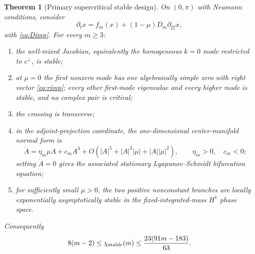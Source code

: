 \documentclass[11pt]{article}
\newtheorem{theorem}{Theorem}[section]
\theoremstyle{definition}
\newcommand{\1}{\mathbf 1}
\begin{document}
\begin{theorem}[Primary supercritical stable design]\label{thm:unitstable}
On $(0,\pi)$ with Neumann conditions, consider
\begin{equation}\label{eq:pdeunit}
 \partial_t x=f_m(x)+(1-\mu)D_m\partial_{\xi\xi}x,
\end{equation}
with \eqref{eq:Dimp}.  For every $m\ge3$:
\begin{enumerate}[leftmargin=2em]
\item the well-mixed Jacobian, equivalently the homogeneous $k=0$ mode
restricted to $c^\perp$, is stable;
\item at $\mu=0$ the first nonzero mode has one algebraically simple zero with
right vector \eqref{eq:rimp}; every other first-mode eigenvalue and every
higher mode is stable, and no complex pair is critical;
\item the crossing is transverse;
\item in the adjoint-projection coordinate, the one-dimensional
center-manifold normal form is
\begin{equation}\label{eq:NFunit}
 \dot A=\eta_m\mu A+c_mA^3+
 O(|A|^5+|A|^3|\mu|+|A||\mu|^2),
 \qquad \eta_m>0,\quad c_m<0;
\end{equation}
setting $\dot A=0$ gives the associated stationary Lyapunov--Schmidt
bifurcation equation;
\item for sufficiently small $\mu>0$, the two positive nonconstant branches
are locally exponentially asymptotically stable in the fixed-integrated-mass
$H^1$ phase space.
\end{enumerate}
Consequently
\begin{equation}\label{eq:stablebounds}
 8(m-2)\le\chi_{\rm stable}(m)
 \le\frac{23(91m-183)}{63}.
\end{equation}
\end{theorem}
\end{document}

